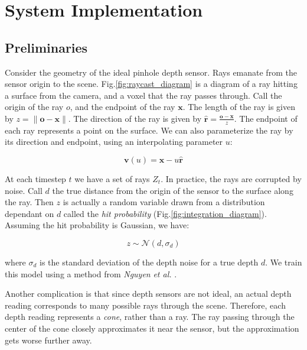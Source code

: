 \documentclass[conference]{IEEEtran}
\newcommand{\figref}[1]{Fig.\ref{#1}}
\newcommand{\etal}{\textit{et al.}\xspace}
\begin{document}
\section{System Implementation} 
\subsection{Preliminaries}
\label{section:prelim}
Consider the geometry of the ideal pinhole depth sensor. Rays emanate from the
sensor origin to the scene.  \figref{fig:raycast_diagram} is a diagram of a ray hitting a
 surface from the camera, and a voxel that the ray passes through.  Call  the
 origin of the ray $o$, and the endpoint of the ray $\mathbf{x}$.
The length of the ray is given by $z = \|\mathbf{o}
- \mathbf{x}\|$. The direction of the ray is given by $\mathbf{\hat{r}} =
\frac{\mathbf{o} - \mathbf{x}}{z}$. The endpoint of each ray represents a point
on the surface.  We can also parameterize the ray by its direction and
endpoint, using an interpolating parameter $u$:

 \begin{equation}
 	\mathbf{v}(u) = \mathbf{x} - u\mathbf{\hat{r}}
 \end{equation}

At each timestep $t$ we have a set of rays $Z_t$. In practice, the rays are
corrupted by noise. Call $d$ the true distance from the origin of the sensor to
the surface along the ray. Then $z$ is actually a random variable drawn from a
distribution dependant on $d$ called the \textit{hit probability}
(\figref{fig:integration_diagram}). Assuming the hit probability is Gaussian, we
have:

\begin{equation}
\label{eqn:hitprobability}
z \sim \mathcal{N}(d, \sigma_d)
\end{equation}

\noindent where $\sigma_d$ is the standard deviation of the depth noise for a
true depth $d$. We train this model using a method from \textit{Nguyen} \etal
\cite{Nguyen2012}.

Another complication is that since depth sensors are not ideal, an actual depth
reading corresponds to many possible rays through the scene. Therefore, each
depth reading represents a \textit{cone}, rather than a ray. The ray passing
through the center of the cone closely approximates it near the sensor, but the
approximation gets worse further away.

\end{document}
